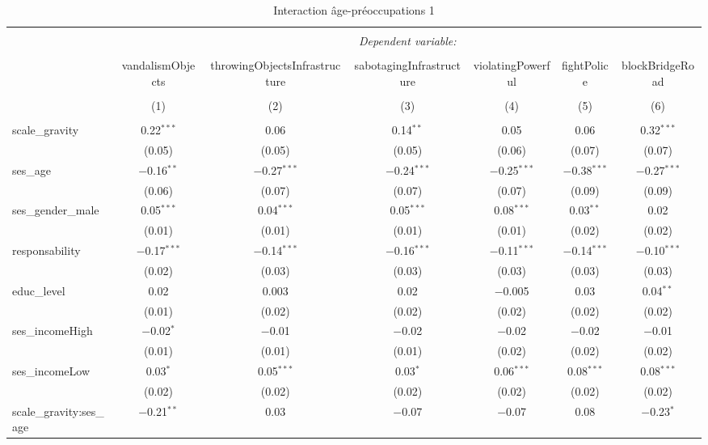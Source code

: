 \documentclass[
]{article}
\begin{document}
\begin{sidewaystable}[!htbp] \centering 
  \caption{Interaction âge-préoccupations 1} 
  \label{} 
\begin{tabular}{@{\extracolsep{1pt}}lcccccc} 
\\[-1.8ex]\hline 
\hline \\[-1.8ex] 
 & \multicolumn{6}{c}{\textit{Dependent variable:}} \\ 
\cline{2-7} 
\\[-1.8ex] & vandalismObjects & throwingObjectsInfrastructure & sabotagingInfrastructure & violatingPowerful & fightPolice & blockBridgeRoad \\ 
\\[-1.8ex] & (1) & (2) & (3) & (4) & (5) & (6)\\ 
\hline \\[-1.8ex] 
 scale\_gravity & 0.22$^{***}$ & 0.06 & 0.14$^{**}$ & 0.05 & 0.06 & 0.32$^{***}$ \\ 
  & (0.05) & (0.05) & (0.05) & (0.06) & (0.07) & (0.07) \\ 
  ses\_age & $-$0.16$^{**}$ & $-$0.27$^{***}$ & $-$0.24$^{***}$ & $-$0.25$^{***}$ & $-$0.38$^{***}$ & $-$0.27$^{***}$ \\ 
  & (0.06) & (0.07) & (0.07) & (0.07) & (0.09) & (0.09) \\ 
  ses\_gender\_male & 0.05$^{***}$ & 0.04$^{***}$ & 0.05$^{***}$ & 0.08$^{***}$ & 0.03$^{**}$ & 0.02 \\ 
  & (0.01) & (0.01) & (0.01) & (0.01) & (0.02) & (0.02) \\ 
  responsability & $-$0.17$^{***}$ & $-$0.14$^{***}$ & $-$0.16$^{***}$ & $-$0.11$^{***}$ & $-$0.14$^{***}$ & $-$0.10$^{***}$ \\ 
  & (0.02) & (0.03) & (0.03) & (0.03) & (0.03) & (0.03) \\ 
  educ\_level & 0.02 & 0.003 & 0.02 & $-$0.005 & 0.03 & 0.04$^{**}$ \\ 
  & (0.01) & (0.02) & (0.02) & (0.02) & (0.02) & (0.02) \\ 
  ses\_incomeHigh & $-$0.02$^{*}$ & $-$0.01 & $-$0.02 & $-$0.02 & $-$0.02 & $-$0.01 \\ 
  & (0.01) & (0.01) & (0.01) & (0.02) & (0.02) & (0.02) \\ 
  ses\_incomeLow & 0.03$^{*}$ & 0.05$^{***}$ & 0.03$^{*}$ & 0.06$^{***}$ & 0.08$^{***}$ & 0.08$^{***}$ \\ 
  & (0.02) & (0.02) & (0.02) & (0.02) & (0.02) & (0.02) \\ 
  scale\_gravity:ses\_age & $-$0.21$^{**}$ & 0.03 & $-$0.07 & $-$0.07 & 0.08 & $-$0.23$^{*}$ \\ 

\end{tabular}
\end{sidewaystable}
\end{document}
